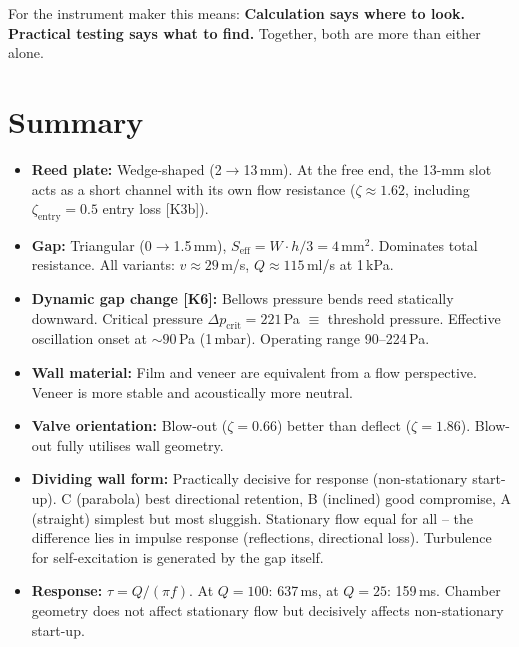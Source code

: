 \documentclass[11pt,a4paper]{article}
\begin{document}
\begin{keybox}
For the instrument maker this means: \textbf{Calculation says where to look. Practical testing says what to find.} Together, both are more than either alone.
\end{keybox}

\section{Summary}

\begin{itemize}[leftmargin=5mm, itemsep=3pt]
\item \textbf{Reed plate:} Wedge-shaped (2$\rightarrow$13\,mm). At the free end, the 13-mm slot acts as a short channel with its own flow resistance ($\zeta \approx 1.62$, including $\zeta_\text{entry} = 0.5$ entry loss [K3b]).

\item \textbf{Gap:} Triangular (0$\rightarrow$1.5\,mm), $S_\text{eff} = W \cdot h/3 = 4$\,mm$^2$. Dominates total resistance. All variants: $v \approx 29$\,m/s, $Q \approx 115$\,ml/s at 1\,kPa.

\item \textbf{Dynamic gap change [K6]:} Bellows pressure bends reed statically downward. Critical pressure $\Delta p_\text{crit} = 221$\,Pa $\equiv$ threshold pressure. Effective oscillation onset at $\sim 90$\,Pa (1\,mbar). Operating range 90--224\,Pa.

\item \textbf{Wall material:} Film and veneer are equivalent from a flow perspective. Veneer is more stable and acoustically more neutral.

\item \textbf{Valve orientation:} Blow-out ($\zeta = 0.66$) better than deflect ($\zeta = 1.86$). Blow-out fully utilises wall geometry.

\item \textbf{Dividing wall form:} Practically decisive for response (non-stationary start-up). C (parabola) best directional retention, B (inclined) good compromise, A (straight) simplest but most sluggish. Stationary flow equal for all -- the difference lies in impulse response (reflections, directional loss). Turbulence for self-excitation is generated by the gap itself.

\item \textbf{Response:} $\tau = Q/(\pi f)$. At $Q = 100$: 637\,ms, at $Q = 25$: 159\,ms. Chamber geometry does not affect stationary flow but decisively affects non-stationary start-up.


\end{itemize}
\end{document}
